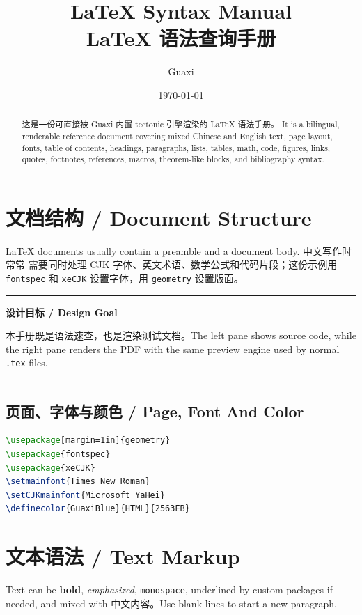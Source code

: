 \documentclass[11pt]{article}
\title{\textbf{LaTeX Syntax Manual}\\LaTeX 语法查询手册}
\author{Guaxi}
\date{\today}
\newenvironment{guaxicallout}[1]
  {\par\medskip\noindent\textcolor{GuaxiBorder}{\rule{\linewidth}{0.6pt}}\par
   \noindent\textbf{\textcolor{GuaxiBlue}{#1}}\par\smallskip\noindent}
  {\par\noindent\textcolor{GuaxiBorder}{\rule{\linewidth}{0.6pt}}\par\medskip}
\begin{document}
\maketitle

\begin{abstract}
这是一份可直接被 Guaxi 内置 tectonic 引擎渲染的 LaTeX 语法手册。
It is a bilingual, renderable reference document covering mixed Chinese and
English text, page layout, fonts, table of contents, headings, paragraphs,
lists, tables, math, code, figures, links, quotes, footnotes, references,
macros, theorem-like blocks, and bibliography syntax.
\end{abstract}

\tableofcontents
\newpage

\section{文档结构 / Document Structure}
\label{sec:structure}

LaTeX documents usually contain a preamble and a document body. 中文写作时常常
需要同时处理 CJK 字体、英文术语、数学公式和代码片段；这份示例用
\texttt{fontspec} 和 \texttt{xeCJK} 设置字体，用 \texttt{geometry} 设置版面。

\begin{guaxicallout}{设计目标 / Design Goal}
本手册既是语法速查，也是渲染测试文档。The left pane shows source code, while
the right pane renders the PDF with the same preview engine used by normal
\texttt{.tex} files.
\end{guaxicallout}

\subsection{页面、字体与颜色 / Page, Font And Color}

\begin{lstlisting}[language=TeX]
\usepackage[margin=1in]{geometry}
\usepackage{fontspec}
\usepackage{xeCJK}
\setmainfont{Times New Roman}
\setCJKmainfont{Microsoft YaHei}
\definecolor{GuaxiBlue}{HTML}{2563EB}
\end{lstlisting}

\section{文本语法 / Text Markup}

Text can be \textbf{bold}, \emph{emphasized}, \texttt{monospace}, underlined by
custom packages if needed, and mixed with 中文内容。Use blank lines to start a
new paragraph.
\end{document}
